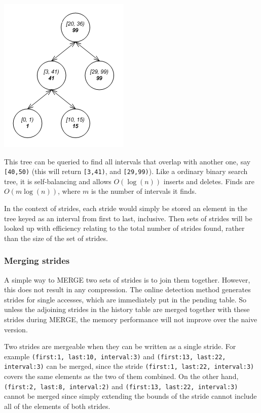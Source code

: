 \documentclass[12pt,twoside]{reedthesis}
\begin{document}
		\includegraphics[scale=0.5]{interval-tree}
		
		This tree can be queried to find all intervals that overlap with another one, say \texttt{[40,50)} (this will return \texttt{[3,41)}, and \texttt{[29,99)}). Like a ordinary binary search tree, it is self-balancing and allows $O(\log(n))$ inserts and deletes. Finds are $O(m\log(n))$, where $m$ is the number of intervals it finds. 
		
		In the context of strides, each stride would simply be stored  an element in the tree keyed as an interval from first to last, inclusive. Then sets of strides will be looked up with efficiency relating to the total number of strides found, rather than the size of the set of strides. 
		
		\subsubsection{Merging strides}
		
		A simple way to MERGE two sets of strides is to join them together. However, this does not result in any compression. The online detection method generates strides for single accesses, which are immediately put in the pending table. So unless the adjoining strides in the history table are merged together with these strides during MERGE, the memory performance will not improve over the naive version. 
		
		Two strides are mergeable when they can be written as a single stride. For example \texttt{(first:1, last:10, interval:3)} and  \texttt{(first:13, last:22, interval:3)} can be merged, since the stride  \texttt{(first:1, last:22, interval:3)} covers the same elements as the two of them combined. On the other hand, \texttt{(first:2, last:8, interval:2)} and \texttt{(first:13, last:22, interval:3)} cannot be merged since simply extending the bounds of the stride cannot include all of the elements of both strides.
		
\end{document}
